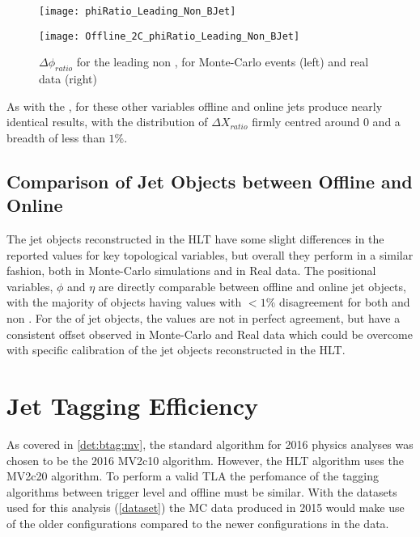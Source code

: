 	\begin{figure}[h]
		\centering
		\begin{minipage}[h]{0.33\linewidth}
			\texttt{[image: phiRatio\_Leading\_Non\_BJet]}
			
		\end{minipage}
		\quad
		\begin{minipage}[h]{0.33\linewidth}
			\texttt{[image: Offline\_2C\_phiRatio\_Leading\_Non\_BJet]}
		\end{minipage}
		\caption{$\Delta \phi_{ratio}$ for the leading non \bjet, for Monte-Carlo events (left) and real data (right)}
		\label{fig:O:leadingnonbphi}
	\end{figure}
	
	As with the \bjets, for these other variables offline and online jets produce nearly identical results, with the distribution of $\Delta X_{ratio}$ firmly centred around 0 and a breadth of less than $1\%$.
	
	\subsection{Comparison of Jet Objects between Offline and Online}
		
		The jet objects reconstructed in the HLT have some slight differences in the reported values for key topological variables, but overall they perform in a similar fashion, both in Monte-Carlo simulations and in Real data. The positional variables, $\phi$ and $\eta$ are directly comparable between offline and online jet objects, with the majority of objects having values with $<1\%$ disagreement for both \bjets and non \bjets. For the \pt of jet objects, the values are not in perfect agreement, but have a consistent offset observed in Monte-Carlo and Real data which could be overcome with specific calibration of the jet objects reconstructed in the HLT. 
	
\newpage
\section{Jet Tagging Efficiency}

	As covered in \ref{det:btag:mv}, the standard algorithm for 2016 physics analyses was chosen to be the 2016 MV2c10 algorithm. However, the HLT \btag algorithm uses the MV2c20 algorithm. \cite{trig2015} To perform a valid TLA the perfomance of the tagging algorithms between trigger level and offline must be similar. With the datasets used for this analysis (\ref{dataset}) the MC data produced in 2015 would make use of the older configurations compared to the newer configurations in the data. 

